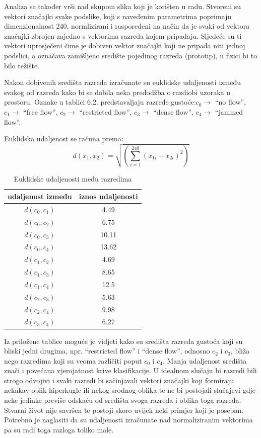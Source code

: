 \documentclass[times, utf8, zavrsni]{fer}
\begin{document}
Analiza se također vrši nad skupom slika koji je korišten u radu. Stvoreni su vektori
značajki svake podslike, koji s navedenim parametrima poprimaju dimenzionalnost 240, 
normlizirani i raspoređeni na način da je svaki
od vektora značajki zbrojen zajedno s vektorima razreda kojem pripadaju.
Sljedeće su ti vektori uprosječeni čime je dobiven vektor značajki 
koji ne pripada niti jednoj podslici, a označava zamišljeno središte
pojedinog razreda (prototip), u fizici bi to bilo težište. 

\bigbreak

Nakon dobivenih središta razreda izračunate su euklidske udaljenosti između svakog
od razreda kako bi se dobila neka predodžba o razdiobi uzoraka u prostoru. 
Oznake u tablici 6.2. predstavaljaju razrede gustoće:\( c_0 \rightarrow \) \enquote{no flow},
\( c_1 \rightarrow \) \enquote{free flow}, \( c_2 \rightarrow \) \enquote{restricted flow}, 
\( c_3 \rightarrow \) \enquote{dense flow}, \( c_4 \rightarrow \) \enquote{jammed flow}.

Euklidska udaljenost se računa prema:
\[
d(x_1, x_2) = \sqrt{\left(\sum_{i=1}^{240} \left(x_{1i}-x_{2i}\right)^2\right)}
\]

\begin{table}[ht]
\centering
\begin{tabular}{c|c}
udaljenost između & iznos udaljenosti \\
\hline
\(d(c_0, c_1)\) & 4.49 \\
\(d(c_0, c_2)\) & 6.75 \\
\(d(c_0, c_3)\) & 10.11 \\
\(d(c_0, c_4)\) & 13.62 \\
\(d(c_1, c_2)\) & 4.69 \\
\(d(c_1, c_3)\) & 8.65 \\
\(d(c_1, c_4)\) & 12.5 \\
\(d(c_2, c_3)\) & 5.63 \\
\(d(c_2, c_4)\) & 9.98 \\
\(d(c_3, c_4)\) & 6.27
\end{tabular}
\caption{Euklidske udaljenosti među razredima} 
\end{table}

Iz priložene tablice moguće je vidjeti kako su središta razreda gustoća koji su bliski jedni drugima, npr.
\enquote{restricted flow} i \enquote{dense flow}, odnosno \(c_2\) i \(c_3\), bliža 
nego razredima koji su veoma različiti poput \(c_0\) i \(c_4\). Manja udaljenost središta znači
i povećana vjerojatnost krive klasifikacije. U idealnom slučaju bi razredi bili strogo odvojivi
i svaki razredi bi sačinjavali vektori značajki koji formiraju nekakav oblik hiperkugle ili nekog srodnog oblika
te ne bi postojali slučajevi gdje neke jedinke previše odskaču od središta svoga razreda i oblika toga razreda.
Stvarni život nije savršen te postoji skoro uvijek neki primjer koji je poseban.  Potrebno je naglasiti da
su udaljenosti izračunate nad normaliziranim vektorima pa su radi toga razloga toliko male.
\end{document}
